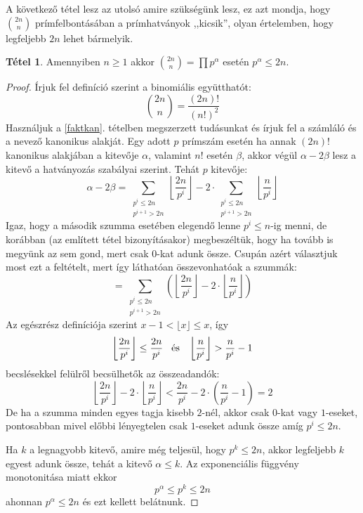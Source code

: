 \documentclass[12pt]{book}
\theoremstyle{plain} %
\theoremstyle{definition} %
\newtheorem{theo/}{Tétel}[section]
\newenvironment{theo}
  {\renewcommand{\qedsymbol}{$\clubsuit$}%
   \pushQED{\qed}\begin{theo/}}
  {\popQED\end{theo/}}
\theoremstyle{remark}
\renewcommand\qedsymbol{$\blacksquare$}
\numberwithin{equation}{section}  %
\begin{document}
	A következő tétel lesz az utolsó amire szükségünk lesz, ez azt mondja, hogy ${2n\choose n}$ prímfelbontásában a prímhatványok ,,kicsik'', olyan értelemben, hogy legfeljebb $2n$ lehet bármelyik.

	\begin{theo}\label{otodik}
		Amennyiben $n\geq 1$ akkor ${2n\choose n} = \displaystyle\prod p^{\alpha}$ esetén $p^{\alpha} \leq 2n$.
	\end{theo}

	\begin{proof}
		Írjuk fel definíció szerint a binomiális együtthatót:
		\[ {2n\choose n} = \dfrac{(2n)!}{(n!)^2}  \]
		Használjuk a \ref{faktkan}. tételben megszerzett tudásunkat és írjuk fel a számláló és a nevező kanonikus alakját. Egy adott $p$ prímszám esetén ha annak $(2n)!$ kanonikus alakjában a kitevője $\alpha$, valamint $n!$ esetén $\beta$, akkor végül $\alpha-2\beta$ lesz a kitevő a hatványozás szabályai szerint. Tehát $p$ kitevője:
		\[ \alpha - 2\beta = \sum\limits_{\substack{p^i\leq 2n \\ p^{i+1}>2n}} \left \lfloor \dfrac{2n}{p^i} \right \rfloor - 2 \cdot \sum\limits_{\substack{p^i\leq 2n \\ p^{i+1}>2n}} \left \lfloor \dfrac{n}{p^i} \right \rfloor  \]
		Igaz, hogy a második szumma esetében elegendő lenne $p^i\leq n$-ig menni, de korábban (az említett tétel bizonyításakor) megbeszéltük, hogy ha tovább is megyünk az sem gond, mert csak $0$-kat adunk össze. Csupán azért választjuk most ezt a feltételt, mert így láthatóan összevonhatóak a szummák:
		\[ = \sum\limits_{\substack{p^i\leq 2n \\ p^{i+1}>2n}} \left( \left \lfloor \dfrac{2n}{p^i} \right \rfloor - 2\cdot  \left \lfloor \dfrac{n}{p^i} \right \rfloor \right) \]
		Az egészrész definíciója szerint $x-1< \lfloor x \rfloor \leq x$, így
		\[ \left \lfloor \dfrac{2n}{p^i} \right \rfloor \leq \dfrac{2n}{p^i} \hspace{3mm} \text{és} \hspace{3mm}   \left \lfloor \dfrac{n}{p^i} \right \rfloor > \dfrac{n}{p^i} - 1  \]
		becslésekkel felülről becsülhetők az összeadandók:
		\[  \left \lfloor \dfrac{2n}{p^i} \right \rfloor - 2\cdot  \left \lfloor \dfrac{n}{p^i} \right \rfloor < \dfrac{2n}{p^i} - 2\cdot \left( \dfrac{n}{p^i} - 1 \right)  =  2  \]
		De ha a szumma minden egyes tagja kisebb $2$-nél, akkor csak $0$-kat vagy $1$-eseket, pontosabban mivel előbbi lényegtelen csak $1$-eseket adunk össze amíg $p^i\leq 2n$.
		
		Ha $k$ a legnagyobb kitevő, amire még teljesül, hogy $p^k\leq 2n$, akkor legfeljebb $k$ egyest adunk össze, tehát a kitevő $\alpha \leq k$. Az exponenciális függvény monotonitása miatt ekkor
		\[ p^\alpha \leq p^k \leq 2n  \]
		ahonnan $p^\alpha \leq 2n$ és ezt kellett belátnunk.
	\end{proof}
\end{document}

